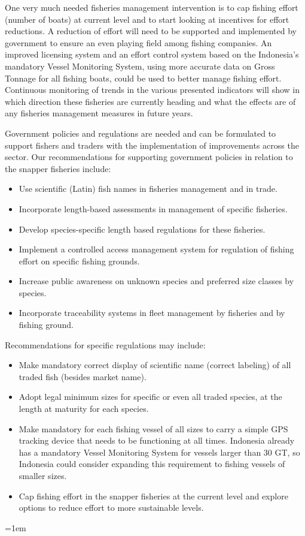 One very much needed fisheries management intervention is to cap fishing effort (number of boats) at current level and to start looking at incentives for effort reductions. A reduction of effort will need to be supported and implemented by government to ensure an even playing field among fishing companies. An improved licensing system and an effort control system based on the Indonesia's mandatory Vessel Monitoring System, using more accurate data on Gross Tonnage for all fishing boats, could be used to better manage fishing effort. Continuous monitoring of trends in the various presented indicators will show in which direction these fisheries are currently heading and what the effects are of any fisheries management measures in future years.

Government policies and regulations are needed and can be formulated to support fishers and traders with the implementation of improvements across the sector. Our recommendations for supporting government policies in relation to the snapper fisheries include:
\parskip=1pt
\begin{itemize}[noitemsep,topsep=0pt,parsep=0pt,partopsep=0pt]
\item Use scientific (Latin) fish names in fisheries management and in trade.
\item Incorporate length-based assessments in management of specific fisheries.
\item Develop species-specific length based regulations for these fisheries.
\item Implement a controlled access management system for regulation of fishing effort on specific fishing grounds.
\item Increase public awareness on unknown species and preferred size classes by species.
\item Incorporate traceability systems in fleet management by fisheries and by fishing ground.
\end{itemize}

\noindent Recommendations for specific regulations may include:
\begin{itemize}[noitemsep,topsep=0pt,parsep=0pt,partopsep=0pt]
\item Make mandatory correct display of scientific name (correct labeling) of all traded fish (besides market name).
\item Adopt legal minimum sizes for specific or even all traded species, at the length at maturity for each species.
\item Make mandatory for each fishing vessel of all sizes to carry a simple GPS tracking device that needs to be functioning at all times. Indonesia already has a mandatory Vessel Monitoring System for vessels larger than 30 GT, so Indonesia could consider expanding this requirement to fishing vessels of smaller sizes.
\item Cap fishing effort in the snapper fisheries at the current level and explore options to reduce effort to more sustainable levels.
\end{itemize}
\parskip=1em